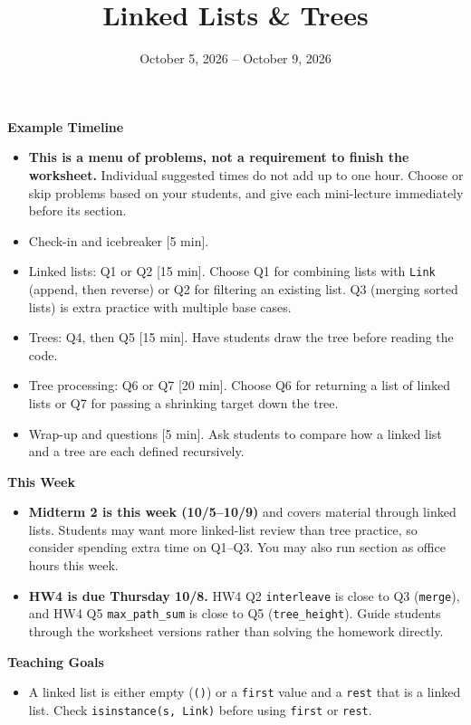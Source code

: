 \documentclass{exam}
\title{Linked Lists \& Trees}
\date{October 5, 2026 -- October 9, 2026}
\begin{document}
\maketitle

\begin{meta}
\small
\textbf{Example Timeline}
\begin{itemize}
    \item \textbf{This is a menu of problems, not a requirement to finish the worksheet.} Individual suggested times do not add up to one hour. Choose or skip problems based on your students, and give each mini-lecture immediately before its section.
    \item Check-in and icebreaker [5 min].
    \item Linked lists: Q1 or Q2 [15 min]. Choose Q1 for combining lists with \lstinline{Link} (append, then reverse) or Q2 for filtering an existing list. Q3 (merging sorted lists) is extra practice with multiple base cases.
    \item Trees: Q4, then Q5 [15 min]. Have students draw the tree before reading the code.
    \item Tree processing: Q6 or Q7 [20 min]. Choose Q6 for returning a list of linked lists or Q7 for passing a shrinking target down the tree.
    \item Wrap-up and questions [5 min]. Ask students to compare how a linked list and a tree are each defined recursively.
\end{itemize}
\textbf{This Week}
\begin{itemize}
    \item \textbf{Midterm 2 is this week (10/5--10/9)} and covers material through linked lists. Students may want more linked-list review than tree practice, so consider spending extra time on Q1--Q3. You may also run section as office hours this week.
    \item \textbf{HW4 is due Thursday 10/8.} HW4 Q2 \lstinline{interleave} is close to Q3 (\lstinline{merge}), and HW4 Q5 \lstinline{max_path_sum} is close to Q5 (\lstinline{tree_height}). Guide students through the worksheet versions rather than solving the homework directly.
\end{itemize}
\textbf{Teaching Goals}
\begin{itemize}
    \item A linked list is either empty (\lstinline{()}) or a \lstinline{first} value and a \lstinline{rest} that is a linked list. Check \lstinline{isinstance(s, Link)} before using \lstinline{first} or \lstinline{rest}.

\end{itemize}
\end{meta}
\end{document}
